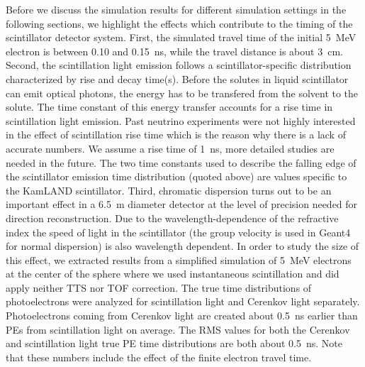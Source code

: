 \documentclass[aps,prc,twocolumn,groupedaddress,showpacs,amsmath,amssymb,floatfix,superscriptaddress]{revtex4}
\begin{document}
Before we discuss the simulation results for different simulation settings in the following sections, we highlight the effects which contribute to the timing of the scintillator detector system. First, the simulated travel time of the initial 5~MeV electron is between 0.10 and 0.15~ns, while the travel distance is about 3~cm. Second, the scintillation light emission follows a scintillator-specific distribution characterized by rise and decay time(s). Before the solutes in liquid scintillator can emit optical photons, the energy has to be transfered from the solvent to the solute. The time constant of this energy transfer accounts for a rise time in scintillation light emission. Past neutrino experiments were not highly interested in the effect of scintillation rise time which is the reason why there is a lack of accurate numbers. We assume a rise time of 1~ns, more detailed studies are needed in the future. The two time constants used to describe the falling edge of the scintillator emission time distribution (quoted above) are values specific to the KamLAND scintillator. Third, chromatic dispersion turns out to be an important effect in a 6.5~m diameter detector at the level of precision needed for direction reconstruction. Due to the wavelength-dependence of the refractive index the speed of light in the scintillator (the group velocity is used in Geant4 for normal dispersion) is also wavelength dependent. In order to study the size of this effect, we extracted results from a simplified simulation of 5~MeV electrons at the center of the sphere where we used instantaneous scintillation and did apply neither TTS nor TOF correction. The true time distributions of photoelectrons were analyzed for scintillation light and Cerenkov light separately. Photoelectrons coming from Cerenkov light are created about 0.5~ns earlier than PEs from scintillation light on average. The RMS values for both the Cerenkov and scintillation light true PE time distributions are both about 0.5~ns. Note that these numbers include the effect of the finite electron travel time.
\end{document}
